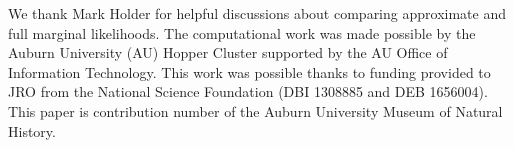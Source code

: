 We thank Mark Holder for helpful discussions about comparing approximate and
full marginal likelihoods.
The computational work was made possible by the Auburn University (AU) Hopper
Cluster supported by the AU Office of Information Technology.
This work was possible thanks to funding provided to JRO from the National
Science Foundation (DBI 1308885 and DEB 1656004).
This paper is contribution number  of the Auburn University
Museum of Natural History.

